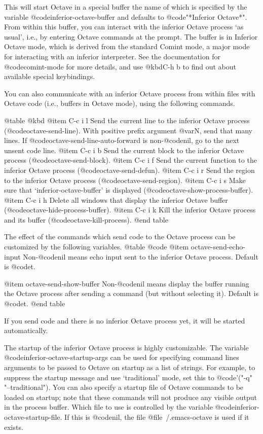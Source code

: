 {{{This will start Octave in a special buffer the name of which is
specified by the variable @code{inferior-octave-buffer} and defaults to
@code{"*Inferior Octave*"}.  From within this buffer, you can
interact with the inferior Octave process `as usual', i.e., by entering
Octave commands at the prompt.  The buffer is in Inferior Octave mode,
which is derived from the standard Comint mode, a major mode for
interacting with an inferior interpreter.  See the documentation for
@code{comint-mode} for more details, and use @kbd{C-h b} to find out
about available special keybindings.

You can also communicate with an inferior Octave process from within
files with Octave code (i.e., buffers in Octave mode), using the
following commands.

@table @kbd
@item C-c i l
Send the current line to the inferior Octave process
(@code{octave-send-line}).
With positive prefix argument @var{N}, send that many lines.
If @code{octave-send-line-auto-forward} is non-@code{nil}, go to the
next unsent code line.
@item C-c i b
Send the current block to the inferior Octave process
(@code{octave-send-block}).
@item C-c i f
Send the current function to the inferior Octave process
(@code{octave-send-defun}).
@item C-c i r
Send the region to the inferior Octave process
(@code{octave-send-region}).
@item C-c i s
Make sure that `inferior-octave-buffer' is displayed
(@code{octave-show-process-buffer}).
@item C-c i h
Delete all windows that display the inferior Octave buffer
(@code{octave-hide-process-buffer}).
@item C-c i k
Kill the inferior Octave process and its buffer
(@code{octave-kill-process}).
@end table

The effect of the commands which send code to the Octave process can be
customized by the following variables.
@table @code
@item octave-send-echo-input
Non-@code{nil} means echo input sent to the inferior Octave process.
Default is @code{t}.

@item octave-send-show-buffer
Non-@code{nil} means display the buffer running the Octave process after
sending a command (but without selecting it).
Default is @code{t}.
@end table

If you send code and there is no inferior Octave process yet, it will be
started automatically.

The startup of the inferior Octave process is highly customizable.
The variable @code{inferior-octave-startup-args} can be used for
specifying command lines arguments to be passed to Octave on startup
as a list of strings.  For example, to suppress the startup message and
use `traditional' mode, set this to @code{'("-q" "--traditional")}.
You can also specify a startup file of Octave commands to be loaded on
startup;  note that these commands will not produce any visible output
in the process buffer.  Which file to use is controlled by the variable
@code{inferior-octave-startup-file}.  If this is @code{nil}, the file
@file{~/.emacs-octave} is used if it exists.

}}}
